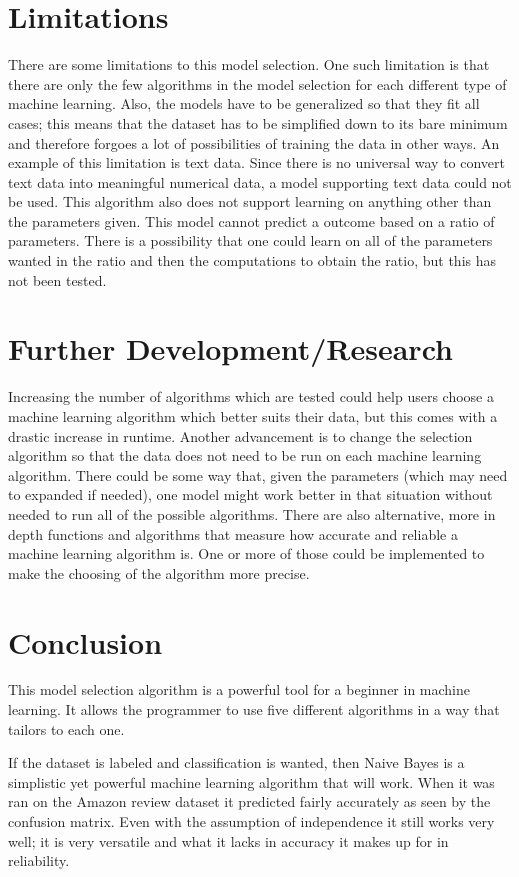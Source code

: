 \documentclass[9pt,twocolumn,twoside]{idsi}
\begin{document}
\section{Limitations}
There are some limitations to this model selection. One such limitation is that there are only the few algorithms in the model selection for each different type of machine learning. Also, the models have to be generalized so that they fit all cases; this means that the dataset has to be simplified down to its bare minimum and therefore forgoes a lot of possibilities of training the data in other ways. An example of this limitation is text data. Since there is no universal way to convert text data into meaningful numerical data, a model supporting text data could not be used. This algorithm also does not support learning on anything other than the parameters given. This model cannot predict a outcome based on a ratio of parameters. There is a possibility that one could learn on all of the parameters wanted in the ratio and then the computations to obtain the ratio, but this has not been tested.

\section{Further Development/Research}
Increasing the number of algorithms which are tested could help users choose a machine learning algorithm which better suits their data, but this comes with a drastic increase in runtime. Another advancement is to change the selection algorithm so that the data does not need to be run on each machine learning algorithm. There could be some way that, given the parameters (which may need to expanded if needed), one model might work better in that situation without needed to run all of the possible algorithms. There are also alternative, more in depth functions and algorithms that measure how accurate and reliable a machine learning algorithm is. One or more of those could be implemented to make the choosing of the algorithm more precise.

\section{Conclusion}
This model selection algorithm is a powerful tool for a beginner in machine learning. It allows the programmer to use five different algorithms in a way that tailors to each one.

If the dataset is labeled and classification is wanted, then Naive Bayes is a simplistic yet powerful machine learning algorithm that will work. When it was ran on the Amazon review dataset it predicted fairly accurately as seen by the confusion matrix. Even with the assumption of independence it still works very well; it is very versatile and what it lacks in accuracy it makes up for in reliability. 
\end{document}
